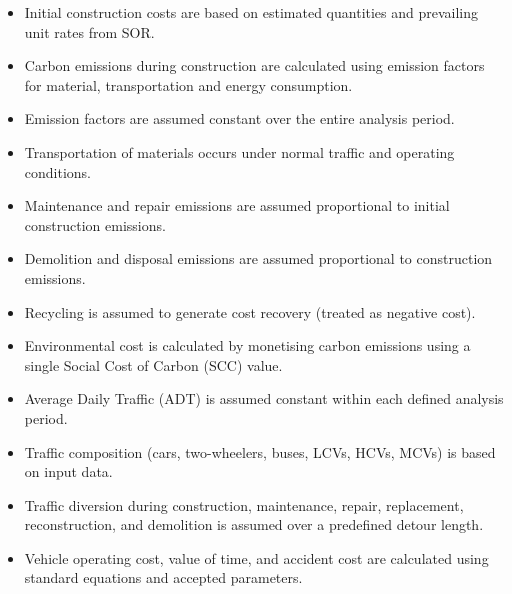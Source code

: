 \documentclass[12pt,a4paper]{article}
\begin{document}
\begin{itemize}
\begin{itemize}
  \item Human injury cost $\rightarrow$ ``Medical accessories''
  \item Petrol $\rightarrow$ ``Mineral Oils''
  \item Diesel $\rightarrow$ ``HSD (High Speed Diesel)''
  \item Engine oil $\rightarrow$ ``Lube oils''
  \item Grease and related oils $\rightarrow$ ``Mineral oil (grouped)''
  \item Tyre costs (by vehicle category) $\rightarrow$ Corresponding tyre index categories
  \item Fixed and depreciation cost $\rightarrow$ ``Manufacture of motor vehicles, trailers and semi-trailers''
  \item Commodity holding cost $\rightarrow$ ``Fuel \& Power''
  \end{itemize}
\item Initial construction costs are based on estimated quantities and prevailing unit rates from SOR.
\item Carbon emissions during construction are calculated using emission factors for material, transportation and energy consumption.
\item Emission factors are assumed constant over the entire analysis period.
\item Transportation of materials occurs under normal traffic and operating conditions.
\item Maintenance and repair emissions are assumed proportional to initial construction emissions.
\item Demolition and disposal emissions are assumed proportional to construction emissions.
\item Recycling is assumed to generate cost recovery (treated as negative cost).
\item Environmental cost is calculated by monetising carbon emissions using a single Social Cost of Carbon (SCC) value.
\item Average Daily Traffic (ADT) is assumed constant within each defined analysis period.
\item Traffic composition (cars, two-wheelers, buses, LCVs, HCVs, MCVs) is based on input data.
\item Traffic diversion during construction, maintenance, repair, replacement, reconstruction, and demolition is assumed over a predefined detour length.
\item Vehicle operating cost, value of time, and accident cost are calculated using standard equations and accepted parameters.

\end{itemize}
\end{document}
